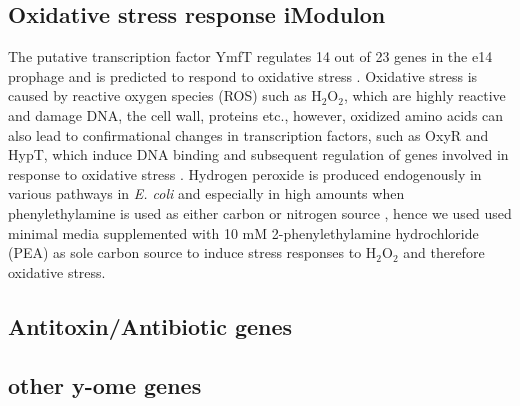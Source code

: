 \subsection{Oxidative stress response iModulon}
The putative transcription factor YmfT regulates 14 out of 23 genes in the e14 prophage and is predicted to respond to oxidative stress \cite{lamoureux2021precise}. Oxidative stress is caused by reactive oxygen species (ROS) such as $\text{H}_2\text{O}_2$, which are highly reactive and damage DNA, the cell wall, proteins \cite{ezraty2017oxidative} etc., however, oxidized amino acids can also lead to confirmational changes in transcription factors, such as OxyR and HypT, which induce DNA binding and subsequent regulation of genes involved in response to oxidative stress  \cite{ezraty2017oxidative}. Hydrogen peroxide is produced endogenously in various pathways in \textit{E. coli} and especially in high amounts when phenylethylamine is used as either carbon or nitrogen source \cite{ravindra2013escherichia}, hence we used used minimal media supplemented with 10 mM 2-phenylethylamine hydrochloride (PEA) as sole carbon source to induce stress responses to $\text{H}_2\text{O}_2$ and therefore oxidative stress. 
\subsection{Antitoxin/Antibiotic genes}
\subsection{other y-ome genes}
